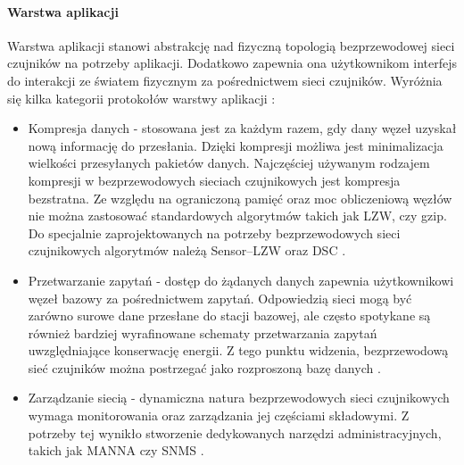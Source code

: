\paragraph{Warstwa aplikacji}
Warstwa aplikacji stanowi abstrakcję nad fizyczną topologią bezprzewodowej sieci czujników na potrzeby aplikacji. Dodatkowo zapewnia ona użytkownikom interfejs do interakcji ze światem fizycznym za pośrednictwem sieci czujników. Wyróżnia się kilka kategorii protokołów warstwy aplikacji \cite{Akyildiz2010}:
\begin{itemize}
\item Kompresja danych - stosowana jest za każdym razem, gdy dany węzeł uzyskał nową informację do przesłania. Dzięki kompresji możliwa jest minimalizacja wielkości przesyłanych pakietów danych. Najczęściej używanym rodzajem kompresji w bezprzewodowych sieciach czujnikowych jest kompresja bezstratna. Ze względu na ograniczoną pamięć oraz moc obliczeniową węzłów nie można zastosować standardowych algorytmów takich jak LZW, czy gzip. Do specjalnie zaprojektowanych na potrzeby bezprzewodowych sieci czujnikowych algorytmów należą Sensor–LZW \cite{Sadler2006} oraz DSC \cite{Slepian1973, Wyner1976}.
\item Przetwarzanie zapytań - dostęp do żądanych danych zapewnia użytkownikowi węzeł bazowy za pośrednictwem zapytań. Odpowiedzią sieci mogą być zarówno surowe dane przesłane do stacji bazowej, ale często spotykane są również bardziej wyrafinowane schematy przetwarzania zapytań uwzględniające konserwację energii. Z tego punktu widzenia, bezprzewodową sieć czujników można postrzegać jako rozproszoną bazę danych \cite{Madden2002}.
\item Zarządzanie siecią - dynamiczna natura bezprzewodowych sieci czujnikowych wymaga monitorowania oraz zarządzania jej częściami składowymi. Z potrzeby tej wynikło stworzenie dedykowanych narzędzi administracyjnych, takich jak MANNA \cite{Ruiz2003} czy SNMS \cite{Tolle2005}.
\end{itemize}


